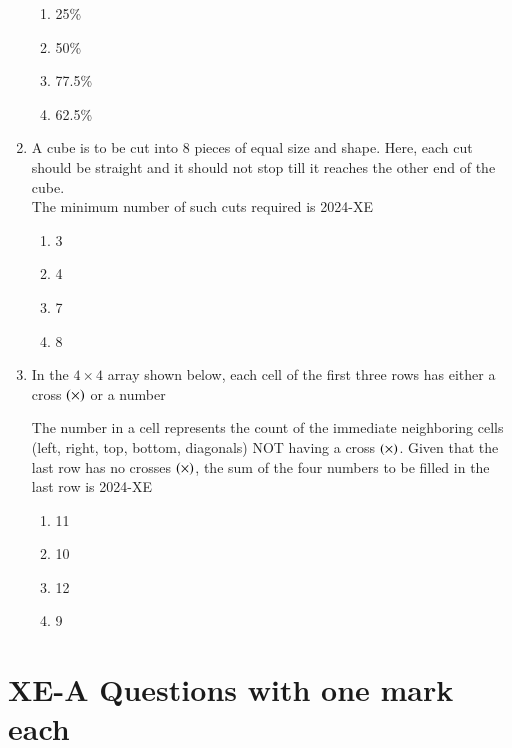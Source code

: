 \documentclass[journal,12pt,onecolumn]{IEEEtran}
\theoremstyle{remark}
\begin{document}
\begin{enumerate}
	\begin{enumerate}
		\item 25\%
		\item 50\%
		\item 77.5\%
		\item 62.5\%
	\end{enumerate}

\item A cube is to be cut into 8 pieces of equal size and shape. Here, each cut should be straight and it should not stop till it reaches the other end of the cube. \\
The minimum number of such cuts required is
\hfill{2024-XE}

		\begin{enumerate}
			\item 3
			\item 4
			\item 7
			\item 8
		\end{enumerate}

\item In the $4 \times 4$ array shown below, each cell of the first three rows has either a cross $\left( \times\right)$ or a number \\
	\begin{table}[ht]
		\centering
		
	\end{table}
The number in a cell represents the count of the immediate neighboring cells (left, right, top, bottom, diagonals) NOT having a cross $\left( \times\right)$. Given that the last row has no crosses $\left( \times\right)$, the sum of the four numbers to be filled in the last row is
\hfill{2024-XE}

		\begin{enumerate}
			\item 11
			\item 10
			\item 12
			\item 9
		\end{enumerate}

\end{enumerate}

\section{XE-A Questions with one mark each}
\end{document}
